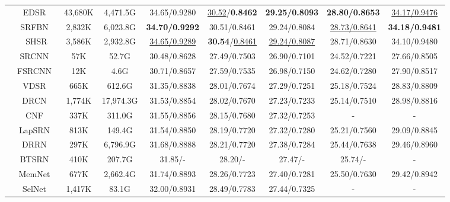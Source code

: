\documentclass[manuscript,screen]{acmart}
\begin{document}
\begin{table*}[t]
\begin{tabular}{|c|c|c|c|c|c|c|c|c|}
		\cline{2-9}
		
		&EDSR~\cite{edsr_cvpr2017}&43,680K& 4,471.5G& 34.65/0.9280& \underline{30.52}/\textbf{0.8462}& \textbf{29.25/0.8093}& \textbf{28.80/0.8653}& \underline{34.17/0.9476}\\
		
		&SRFBN~\cite{srfbn_cvpr2019}&2,832K& 6,023.8G& \textbf{34.70/0.9292}& 30.51/0.8461& 29.24/0.8084& \underline{28.73/0.8641}& \textbf{34.18/0.9481}\\
		


		&SHSR&3,586K& 2,932.8G&\underline{34.65/0.9289}& \textbf{30.54}/\underline{0.8461}& \underline{29.24/0.8087}& 28.71/0.8630& 34.10/0.9480 \\
\hline
		\hline
		\multirow{18}{*}{}&SRCNN~\cite{srcnn_pami2016}&57K &52.7G & 
		30.48/0.8628& 27.49/0.7503& 26.90/0.7101& 24.52/0.7221& 27.66/0.8505\\
		
		&FSRCNN~\cite{fsrcnn_eccv2016}&12K&4.6G& 
		30.71/0.8657& 27.59/0.7535& 26.98/0.7150& 24.62/0.7280& 27.90/0.8517\\
		
		&VDSR~\cite{vdsr_cvpr2016}&665K&612.6G& 
		31.35/0.8838& 28.01/0.7674& 27.29/0.7251& 25.18/0.7524& 28.83/0.8809\\
		
		&DRCN~\cite{drcn_cvpr2016}&1,774K&17,974.3G& 
		31.53/0.8854& 28.02/0.7670& 27.23/0.7233& 25.14/0.7510& 28.98/0.8816\\
		
		&CNF~\cite{cnf_cvprw2017}&337K&311.0G& 
		31.55/0.8856& 28.15/0.7680& 27.32/0.7253& - & - \\
		
		&LapSRN~\cite{lapsrn_cvpr2017}&813K&149.4G& 
		31.54/0.8850& 28.19/0.7720& 27.32/0.7280& 25.21/0.7560& 29.09/0.8845\\
		
		&DRRN~\cite{drrn_cvpr2017}&297K&6,796.9G& 
		31.68/0.8888& 28.21/0.7720& 27.38/0.7284& 25.44/0.7638& 29.46/0.8960\\
		
		&BTSRN~\cite{btsrn_cvprw2017}&410K&207.7G& 
		31.85/-& 28.20/-& 27.47/-& 25.74/-& -\\
		
		&MemNet~\cite{memnet_iccv2017}&677K&2,662.4G& 
		31.74/0.8893& 28.26/0.7723& 27.40/0.7281& 25.50/0.7630& 29.42/0.8942 \\
		
		&SelNet~\cite{selnet_cvprw2017}&1,417K&83.1G& 
		32.00/0.8931& 28.49/0.7783& 27.44/0.7325& - &  - \\
		

\end{tabular}
\end{table*}
\end{document}
